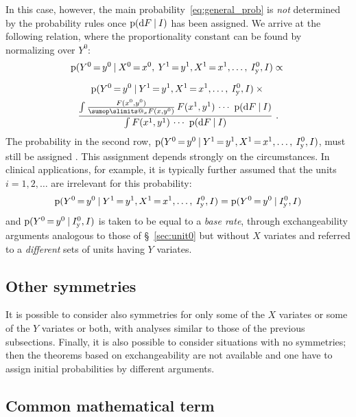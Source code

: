 \documentclass[\ifafour a4paper,12pt,\else a5paper,10pt,\fi%
onecolumn,oneside,article,%
british%
]{memoir}
\makeatletter
\theoremstyle{remark}
\theoremstyle{innote}
\def\sum{\DOTSI\sumop\slimits@}
\newcommand*{\di}{\mathrm{d}}%
\newcommand*{\p}{\mathrm{p}}%
\renewcommand*{\|}[1][]{\nonscript\:#1\vert\nonscript\:\mathopen{}}
\newcommand*{\mo}[1][=]{\mathord{\,#1\,}}
\newcommand*{\sect}{\S}%
\newcommand*{\Iy}{I_{\textrm{y}}}
\makeatother
\begin{document}
  In this case, however, the main probability~\eqref{eq:general_prob} is \emph{not} determined by the probability rules once $\p(\di F\|I)$ has been assigned. We arrive at the following relation, where the proportionality constant can be found by normalizing over $Y^{0}$:
\begin{multline}
  \label{eq:relation_exchY}
  \p(Y^{0}\mo y^{0} \|
  X^{0}\mo x^{0},\: Y^{1}\mo y^{1},X^{1}\mo x^{1},\dotsc,\: \Iy^{0},I)
  \propto
{}\\[2\jot]
  \p(Y^{0}\mo y^{0} \|
  Y^{1}\mo y^{1},X^{1}\mo x^{1},\dotsc,\: \Iy^{0},I) \times{}\\
  \frac{
    \int \frac{F(x^{0},y^{0})}{\sum_{x}F(x,y^{0})}\, F(x^{1},y^{1})\,\dotsm\  \p(\di F \|I)
  }{
    \int F(x^{1},y^{1})\,\dotsm\  \p(\di F \|I)
  } \ .
\end{multline}
The probability in the second row, $\p(Y^{0}\mo y^{0} \| Y^{1}\mo y^{1},X^{1}\mo x^{1},\dotsc,\: \Iy^{0},I)$, must still be assigned \autocites{lindleyetal1981}. This assignment depends strongly on the circumstances. In clinical applications, for example, it is typically further assumed that the units $i=1,2,\dotsc$ are irrelevant for this probability:
\begin{equation}
  \label{eq:indepYfromdata}
    \p(Y^{0}\mo y^{0} \|
  Y^{1}\mo y^{1},X^{1}\mo x^{1},\dotsc,\: \Iy^{0},I) =
    \p(Y^{0}\mo y^{0} \| \Iy^{0},I)
\end{equation}
and $\p(Y^{0}\mo y^{0} \| \Iy^{0},I)$ is taken to be equal to a \emph{base rate}\autocites{barhillel1980,jennyetal2018,sprengeretal2021,matthews1996}, through exchangeability arguments analogous to those of \sect~\ref{sec:unit0} but without $X$ variates and referred to a \emph{different} sets of units having $Y$ variates.

\subsection{Other symmetries}
\label{sec:other_symm}

It is possible to consider also symmetries for only some of the $X$ variates or some of the $Y$ variates or both, with analyses similar to those of the previous subsections. Finally, it is also possible to consider situations with no symmetries; then the theorems based on exchangeability are not available and one have to assign initial probabilities by different arguments.

\subsection{Common mathematical term}
\label{sec:common_term}
\end{document}
